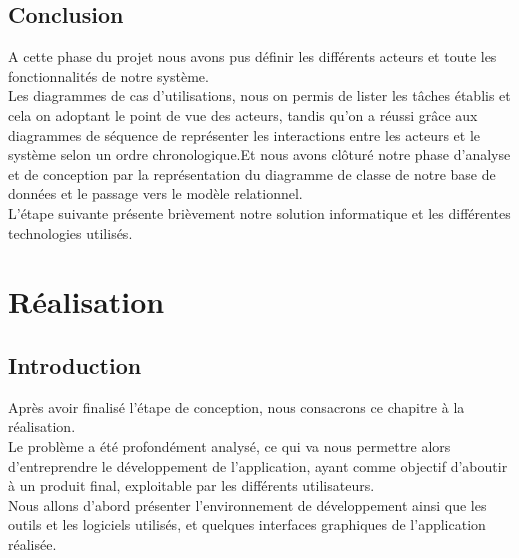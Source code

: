 \documentclass{report}
\begin{document}
\section{Conclusion}
A cette phase du projet nous avons pus définir les différents acteurs et toute les fonctionnalités de notre système.\\
Les diagrammes de cas d’utilisations, nous on permis de lister les tâches établis et cela on adoptant le point de vue des acteurs, tandis qu'on a réussi grâce aux diagrammes de séquence  de représenter les interactions entre les acteurs et le système selon un ordre chronologique.Et nous avons clôturé notre phase d'analyse et de conception par la représentation du diagramme de classe de notre base de données et le passage vers le modèle relationnel.\\
L'étape suivante présente brièvement notre solution informatique et les différentes technologies utilisés.

\chapter{Réalisation}
\newpage
\section{Introduction}
Après avoir finalisé l’étape de conception, nous consacrons ce chapitre à la réalisation.\\
Le problème a été profondément analysé, ce qui va nous permettre alors d’entreprendre le développement de l’application, ayant comme objectif d’aboutir à un produit final, exploitable par les différents utilisateurs.\\
Nous allons d’abord présenter l’environnement de développement ainsi que les outils et les logiciels utilisés, et quelques interfaces graphiques de l’application réalisée.\\
\end{document}
